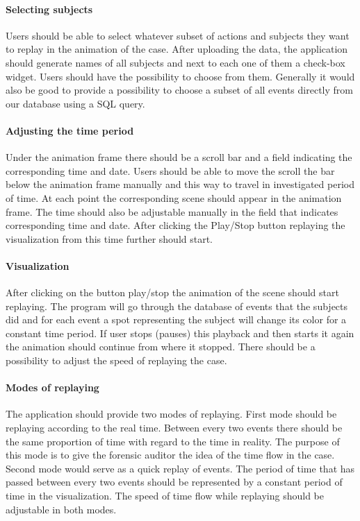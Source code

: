\paragraph{Selecting subjects}
Users should be able to select whatever subset of actions and subjects they want to replay in the animation of the case. After uploading the data, the application should generate names of all subjects and next to each one of them a check-box widget. Users should have the possibility to choose from them. Generally it would also be good to provide a possibility to choose a subset of all events directly from our database using a SQL query.

\paragraph{Adjusting the time period}
Under the animation frame there should be a scroll bar and a field indicating the corresponding time and date. Users should be able to move the scroll the bar below the animation frame manually and this way to travel in investigated period of time. At each point the corresponding scene should appear in the animation frame. The time should also be adjustable manually in the field that indicates corresponding time and date. After clicking the Play/Stop button replaying the visualization from this time further should start. 

\paragraph{Visualization}
After clicking on the button play/stop the animation of the scene should start replaying. The program will go through the database of events that the subjects did and for each event a spot representing the subject will change its color for a constant time period. If user stops (pauses) this playback and then starts it again the animation should continue from where it stopped. There should be a possibility to adjust the speed of replaying the case. 

\paragraph{Modes of replaying}
The application should provide two modes of replaying. First mode should be replaying according to the real time. Between every two events there should be the same proportion of time with regard to the time in reality. The purpose of this mode is to give the forensic auditor the idea of the time flow in the case. Second mode would serve as a quick replay of events. The period of time that has passed between every two events should be represented by a constant period of time in the visualization. The speed of time flow while replaying should be adjustable in both modes.

